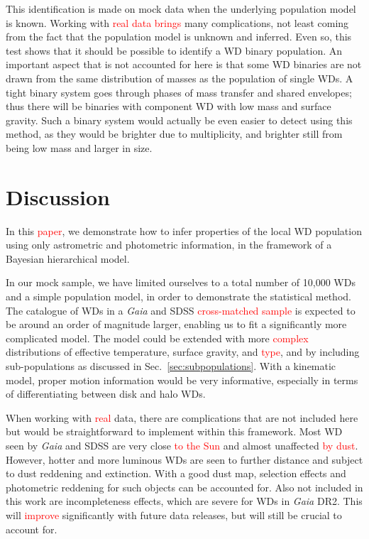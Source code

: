 \documentclass[fleqn,usenatbib]{mnras}
\newcommand{\changes}[1]{\textcolor{red}{#1}}
\begin{document}
This identification is made on mock data when the underlying population model is known. Working with \changes{real data brings} many complications, not least coming from the fact that the population model is unknown and inferred. Even so, this test shows that it should be possible to identify a WD binary population. An important aspect that is not accounted for here is that some WD binaries are not drawn from the same distribution of masses as the population of single WDs. A tight binary system goes through phases of mass transfer and shared envelopes; thus there will be binaries with component WD with low mass and surface gravity. Such a binary system would actually be even easier to detect using this method, as they would be brighter due to multiplicity, and brighter still from being low mass and larger in size.







\section{Discussion}\label{sec:discussion}

In this \changes{paper}, we demonstrate how to infer properties of the local WD population using only astrometric and photometric information, in the framework of a Bayesian hierarchical model.

In our mock sample, we have limited ourselves to a total number of 10,000 WDs and a simple population model, in order to demonstrate the statistical method. The catalogue of WDs in a \emph{Gaia} and SDSS \changes{cross-matched sample} is expected to be around an order of magnitude larger, enabling us to fit a significantly more complicated model. The model could be extended with more \changes{complex} distributions of effective temperature, surface gravity, and \changes{type}, and by including sub-populations as discussed in Sec.~\ref{sec:subpopulations}. With a kinematic model, proper motion information would be very informative, especially in terms of differentiating between disk and halo WDs.

When working with \changes{real} data, there are complications that are not included here but would be straightforward to implement within this framework. Most WD seen by \emph{Gaia} and SDSS are very close \changes{to the Sun} and almost unaffected \changes{by dust}. However, hotter and more luminous WDs are seen to further distance and subject to dust reddening and extinction. With a good dust map, selection effects and photometric reddening for such objects can be accounted for. Also not included in this work are incompleteness effects, which are severe for WDs in \emph{Gaia} DR2. This will \changes{improve} significantly with future data releases, but will still be crucial to account for.
\end{document}
